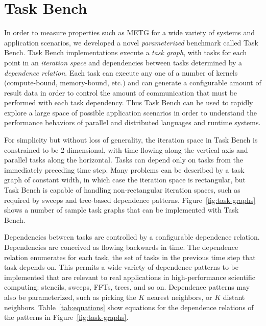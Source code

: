 \section{Task Bench}
\label{sec:task-bench}



In order to measure properties such as METG for a wide variety of
systems and application scenarios, we developed a novel
\emph{parameterized} benchmark called Task Bench. Task Bench
implementations execute a \emph{task graph}, with tasks for each point
in an \emph{iteration space} and dependencies between tasks determined
by a \emph{dependence relation}. Each task can execute any one of a
number of kernels (compute-bound, memory-bound, etc.) and can generate
a configurable amount of result data in order to control the amount of
communication that must be performed with each task dependency. Thus Task Bench can be used to
rapidly explore a large space of possible application scenarios in
order to understand the performance behaviors of parallel and
distributed languages and runtime systems.

For simplicity but without loss of generality, the iteration space in
Task Bench is constrained to be 2-dimensional, with time flowing along
the vertical axis and parallel tasks along the
horizontal. Tasks can depend only on tasks from the immediately
preceding time step. Many problems can be described by a task graph of
constant width, in which case the iteration space is rectangular, but
Task Bench is capable of handling non-rectangular iteration spaces,
such as required by sweeps and tree-based dependence
patterns. Figure~\ref{fig:task-graphs} shows a number of sample task
graphs that can be implemented with Task Bench.


Dependencies between tasks are controlled by a configurable dependence
relation. Dependencies are conceived as flowing backwards in time. The
dependence relation enumerates for each task, the set of tasks in the
previous time step that task depends on. This permits a wide variety
of dependence patterns to be implemented that are relevant to real
applications in high-performance scientific computing: stencils,
sweeps, FFTs, trees, and so on. Dependence patterns may also be
parameterized, such as picking the $K$ nearest neighbors, or $K$
distant neighbors. Table~\ref{tab:equations} show equations for the
dependence relations of the patterns in Figure~\ref{fig:task-graphs}.

